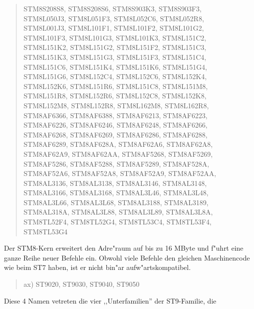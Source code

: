 \documentclass[12pt,a4paper,twoside]{report}
\begin{document}
\begin{quote}
    STM8S208S8, STM8S208S6, STM8S903K3, STM8S903F3,\\
    STM8L050J3, STM8L051F3, STM8L052C6, STM8L052R8,\\
    STM8L001J3, STM8L101F1, STM8L101F2, STM8L101G2,\\
    STM8L101F3, STM8L101G3, STM8L101K3, STM8L151C2,\\
    STM8L151K2, STM8L151G2, STM8L151F2, STM8L151C3,\\
    STM8L151K3, STM8L151G3, STM8L151F3, STM8L151C4,\\
    STM8L151C6, STM8L151K4, STM8L151K6, STM8L151G4,\\
    STM8L151G6, STM8L152C4, STM8L152C6, STM8L152K4,\\
    STM8L152K6, STM8L151R6, STM8L151C8, STM8L151M8,\\
    STM8L151R8, STM8L152R6, STM8L152C8, STM8L152K8,\\
    STM8L152M8, STM8L152R8, STM8L162M8, STM8L162R8,\\
    STM8AF6366, STM8AF6388, STM8AF6213, STM8AF6223,\\
    STM8AF6226, STM8AF6246, STM8AF6248, STM8AF6266,\\
    STM8AF6268, STM8AF6269, STM8AF6286, STM8AF6288,\\
    STM8AF6289, STM8AF628A, STM8AF62A6, STM8AF62A8,\\
    STM8AF62A9, STM8AF62AA, STM8AF5268, STM8AF5269,\\
    STM8AF5286, STM8AF5288, STM8AF5289, STM8AF528A,\\
    STM8AF52A6, STM8AF52A8, STM8AF52A9, STM8AF52AA,\\
    STM8AL3136, STM8AL3138, STM8AL3146, STM8AL3148,\\
    STM8AL3166, STM8AL3168, STM8AL3L46, STM8AL3L48,\\
    STM8AL3L66, STM8AL3L68, STM8AL3188, STM8AL3189,\\
    STM8AL318A, STM8AL3L88, STM8AL3L89, STM8AL3L8A,\\
    STM8TL52F4, STM8TL52G4, STM8TL53C4, STM8TL53F4,\\
    STM8TL53G4
\end{quote}
Der STM8-Kern erweitert den Adre"raum auf bis zu 16 MByte und f"uhrt
eine ganze Reihe neuer Befehle ein.  Obwohl viele Befehle den
gleichen Maschinencode wie beim ST7 haben, ist er nicht bin"ar
aufw"artskompatibel.
\begin{quote}
ax) ST9020, ST9030, ST9040, ST9050
\end{quote}
Diese 4 Namen vetreten die vier ,,Unterfamilien'' der ST9-Familie, die
\end{document}
